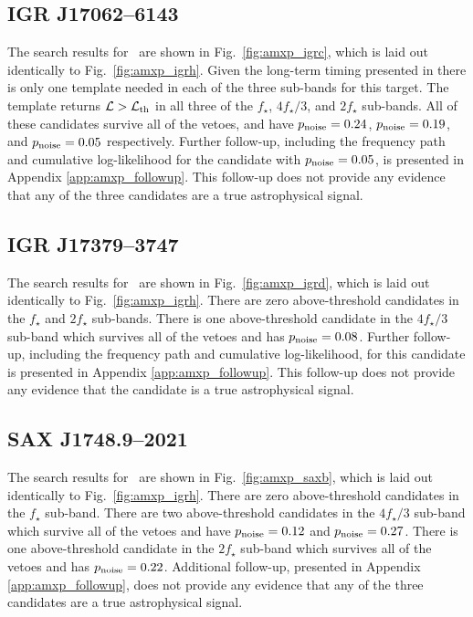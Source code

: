 \subsection{IGR J17062--6143  \label{sec:amxp_igrc} }
The search results for \igrc\ are shown in Fig.~\ref{fig:amxp_igrc}, which is laid out identically to Fig.~\ref{fig:amxp_igrh}. Given the long-term timing presented in \citet{Bult2021} there is only one template needed in each of the three sub-bands for this target. The template returns $\mathcal{L} > \mathcal{L}_{\rm th}$ in all three of the $f_\star$, $4f_\star / 3$, and $2f_\star$ sub-bands. All of these candidates survive all of the vetoes, and have $p_{\rm noise}=0.24$, $p_{\rm noise}=0.19$, and $p_{\rm noise}=0.05$ respectively. Further follow-up, including the frequency path and cumulative log-likelihood for the candidate with $p_{\rm noise}=0.05$, is presented in Appendix \ref{app:amxp_followup}. This follow-up does not provide any evidence that any of the three candidates are a true astrophysical signal.

\subsection{IGR J17379--3747  \label{sec:amxp_igrd} }
The search results for \igrd\ are shown in Fig.~\ref{fig:amxp_igrd}, which is laid out identically to Fig.~\ref{fig:amxp_igrh}. There are zero above-threshold candidates in the $f_\star$ and $2f_\star$ sub-bands. There is one above-threshold candidate in the $4f_\star/3$ sub-band which survives all of the vetoes and has $p_{\rm noise}=0.08$. Further follow-up, including the frequency path and cumulative log-likelihood, for this candidate is presented in Appendix \ref{app:amxp_followup}. This follow-up does not provide any evidence that the candidate is a true astrophysical signal.

\subsection{SAX J1748.9--2021   \label{sec:amxp_saxb} }
The search results for \saxb\ are shown in Fig.~\ref{fig:amxp_saxb}, which is laid out identically to Fig.~\ref{fig:amxp_igrh}. There are zero above-threshold candidates in the $f_\star$ sub-band. There are two above-threshold candidates in the $4 f_\star / 3$ sub-band which survive all of the vetoes and have $p_{\rm noise}=0.12$ and $p_{\rm noise}=0.27$. There is one above-threshold candidate in the $2 f_\star$ sub-band which survives all of the vetoes and has $p_{\rm noise}=0.22$. Additional follow-up, presented in Appendix \ref{app:amxp_followup}, does not provide any evidence that any of the three candidates are a true astrophysical signal.

